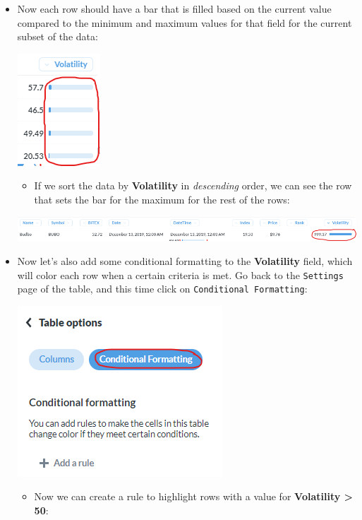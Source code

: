 \documentclass[]{book}
\providecommand{\tightlist}{%
  \setlength{\itemsep}{0pt}\setlength{\parskip}{0pt}}
\begin{document}
\begin{itemize}
\begin{itemize}
    \begin{itemize}
    \item
      Now each row should have a bar that is filled based on the current value compared to the minimum and maximum values for that field for the current subset of the data:

      \includegraphics{images/VolatilityMiniBarChart.png}

      \begin{itemize}
      \tightlist
      \item
        If we sort the data by \textbf{Volatility} in \emph{descending} order, we can see the row that sets the bar for the maximum for the rest of the rows:
      \end{itemize}

      \includegraphics{images/MaximumVolatility.png}
    \item
      Now let's also add some conditional formatting to the \textbf{Volatility} field, which will color each row when a certain criteria is met. Go back to the \texttt{Settings} page of the table, and this time click on \texttt{Conditional\ Formatting}:

      \includegraphics{images/ConditionalFormattingSelect.png}

      \begin{itemize}
      \tightlist
      \item
        Now we can create a rule to highlight rows with a value for \textbf{Volatility \textgreater{} 50}:
      \end{itemize}


\end{itemize}
\end{itemize}
\end{itemize}
\end{document}
